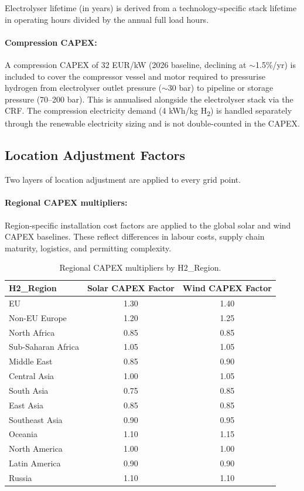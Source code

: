 Electrolyser lifetime (in years) is derived from a technology-specific stack lifetime in operating hours divided by the annual full load hours.

\paragraph{Compression CAPEX:}
A compression CAPEX of 32 EUR/kW (2026 baseline, declining at $\sim$1.5\%/yr) is included to cover the compressor vessel and motor required to pressurise hydrogen from electrolyser outlet pressure ($\sim$30 bar) to pipeline or storage pressure (70--200 bar). This is annualised alongside the electrolyser stack via the CRF. The compression electricity demand (4 kWh/kg H\textsubscript{2}) is handled separately through the renewable electricity sizing and is not double-counted in the CAPEX.

\subsection{Location Adjustment Factors}
\label{subsec:location-adj}

Two layers of location adjustment are applied to every grid point.

\paragraph{Regional CAPEX multipliers:} Region-specific installation cost factors are applied to the global solar and wind CAPEX baselines. These reflect differences in labour costs, supply chain maturity, logistics, and permitting complexity.

\begin{table}[htbp]
    \centering
    \caption{Regional CAPEX multipliers by H2\_Region.}
    \label{tab:regional-factors}
    \small
    \begin{tabular}{lcc}
        \toprule
        H2\_Region & Solar CAPEX Factor & Wind CAPEX Factor \\
        \midrule
        EU                  & 1.30 & 1.40 \\
        Non-EU Europe       & 1.20 & 1.25 \\
        North Africa        & 0.85 & 0.85 \\
        Sub-Saharan Africa  & 1.05 & 1.05 \\
        Middle East         & 0.85 & 0.90 \\
        Central Asia        & 1.00 & 1.05 \\
        South Asia          & 0.75 & 0.85 \\
        East Asia           & 0.85 & 0.85 \\
        Southeast Asia      & 0.90 & 0.95 \\
        Oceania             & 1.10 & 1.15 \\
        North America       & 1.00 & 1.00 \\
        Latin America       & 0.90 & 0.90 \\
        Russia              & 1.10 & 1.10 \\
        \bottomrule
    \end{tabular}
\end{table}

